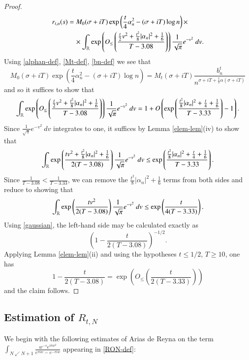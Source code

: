 \begin{proof}
\begin{align*}
 r_{t,n}(s) &= M_0(\sigma+iT) \exp\left( \frac{t}{4} \alpha_n^2 - (\sigma+iT) \log n\right) \times \\
&\quad \times  \int_{\mathbb{R}} \exp\left(  O_{\leq}\left( \frac{\frac{t}{2}v^2 + \frac{t^2}{8} |\alpha_n|^2 + \frac{1}{6}}{T-3.08} \right) \right) \frac{1}{\sqrt{\pi}} e^{-v^2}\ dv.
\end{align*}
Using \eqref{alphan-def}, \eqref{Mt-def}, \eqref{bn-def} we see that
$$ M_0(\sigma+iT) \exp\left( \frac{t}{4} \alpha_n^2 - (\sigma+iT) \log n\right) = M_t(\sigma+iT) \frac{b_n^t}{n^{\sigma+iT+\frac{t}{2} \alpha(\sigma+iT)}} $$
and so it suffices to show that
$$  \int_{\mathbb{R}} \exp\left( O_{\leq}\left( \frac{\frac{t}{2}v^2 + \frac{t^2}{8} |\alpha_n|^2 + \frac{1}{6}}{T-3.08} \right) \right)\frac{1}{\sqrt{\pi}} e^{-v^2}\ dv = 1 + O\left(\exp\left( \frac{\frac{t^2}{8} |\alpha_n|^2 + \frac{t}{4} + \frac{1}{6}}{T-3.33} \right)-1\right).$$
Since $\frac{1}{\sqrt{\pi}} e^{-v^2}\ dv $ integrates to one, it suffices by Lemma \ref{elem-lem}(iv) to show that
$$
  \int_{\mathbb{R}} \exp\left( \frac{t v^2+ \frac{t^2}{8} |\alpha_n|^2 + \frac{1}{6}}{2(T-3.08)} \right) \frac{1}{\sqrt{\pi}} e^{-v^2}\ dv \leq \exp\left( \frac{\frac{t^2}{8} |\alpha_n|^2 + \frac{t}{4} + \frac{1}{6}}{T-3.33} \right).
$$
Since $\frac{1}{T-3.08} < \frac{1}{T-3.33}$, we can remove the $\frac{t^2}{8} |\alpha_n|^2 + \frac{1}{6}$ terms from both sides and reduce to showing that
\begin{equation}\label{ax}
  \int_{\mathbb{R}} \exp\left( \frac{t v^2}{2(T-3.08)} \right) \frac{1}{\sqrt{\pi}} e^{-v^2}\ dv \leq \exp\left( \frac{t}{4(T-3.33)} \right).
	\end{equation}
Using \eqref{gaussian}, the left-hand side may be calculated exactly as
$$ \left(1 - \frac{t}{2(T-3.08)}\right)^{-1/2}.$$
Applying Lemma \ref{elem-lem}(ii) and using the hypotheses $t \leq 1/2$, $T \geq 10$, one has
$$ 1 - \frac{t}{2(T-3.08)} = \exp\left( O_{\leq}\left( \frac{t}{2(T-3.33)} \right)\right)$$
and the claim follows.
\end{proof}

\subsection{Estimation of $R_{t,N}$}

We begin with the following estimates of Arias de Reyna \cite{arias} on the term $\int_{N \swarrow N+1} \frac{w^{-s} e^{i\pi w^2}}{e^{\pi i w} - e^{-\pi i w}}$ appearing in \eqref{RON-def}:

